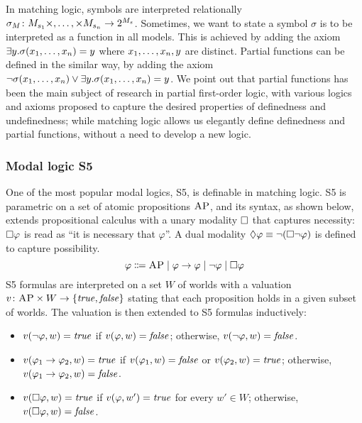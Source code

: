 \documentclass{amsart}
\begin{document}
In matching logic, symbols are interpreted relationally
$\sigma_M \colon M_{s_1} \times ,\dots, \times M_{s_n} \to 2^{M_s}$.
Sometimes, we want to state a symbol $\sigma$ is to be interpreted
as a function in all models.
This is achieved by adding the axiom
$\exists y . \sigma(x_1 ,\dots, x_n) = y$
where $x_1 ,\dots, x_n , y$ are distinct.
Partial functions can be defined in the similar way, by adding the axiom
$\neg \sigma(x_1 ,\dots, x_n) \vee \exists y . \sigma(x_1 ,\dots, x_n) = y$.
We point out that partial functions has been the main subject of research
in partial first-order logic, with various logics and axioms proposed
to capture the desired properties of definedness and undefinedness;
while matching logic allows us elegantly define definedness and partial 
functions, without a need to develop a new logic.

\subsubsection{Modal logic S5}
\label{sec_modal_logic_S5}
One of the most popular modal logics, S5, is definable in 
matching logic.
S5 is parametric on a set of atomic propositions $\textsc{AP}$,
and 
its syntax, as shown below, extends propositional calculus with a unary modality
${\square}$ that captures necessity:
${\square} \varphi$ is read as ``it is necessary that $\varphi$''.
A dual modality ${\lozenge} \varphi \equiv \neg ({\square} \neg \varphi)$
is defined to capture possibility.
\begin{equation*}
\varphi \Coloneqq
\textsc{AP} \mid \varphi \to \varphi
\mid \neg \varphi
\mid {\square} \varphi
\end{equation*}
S5 formulas are interpreted on a set $W$ of worlds
with a valuation $v \colon \textsc{AP} \times W \to \{ \mathit{true}, \mathit{false} \}$
stating that each proposition holds in a given subset of worlds.
The valuation is then extended to S5 formulas inductively:
\begin{itemize}
\item $v(\neg \varphi, w) = \mathit{true}$ if $v(\varphi, w) = \mathit{false}$;
      otherwise,
      $v(\neg \varphi, w) = \mathit{false}$.
\item $v(\varphi_1 \to \varphi_2, w) = \mathit{true}$
      if $v(\varphi_1, w) = \mathit{false}$ or $v(\varphi_2, w) = \mathit{true}$;
      otherwise,
      $v(\varphi_1 \to \varphi_2, w) = \mathit{false}$.
\item $v({\square} \varphi, w) = \mathit{true}$ if
      $v(\varphi, w') = \mathit{true}$ for every $w' \in W$;
      otherwise,
      $v({\square} \varphi, w) = \mathit{false}$.
\end{itemize}
\end{document}
